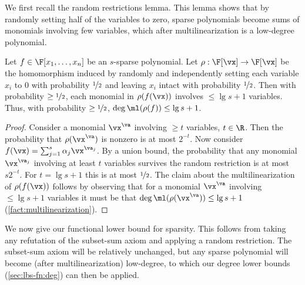 \documentclass{toc}
\begin{document}
We first recall the random restrictions lemma.  This lemma shows that by randomly setting half of the variables to zero, sparse polynomials become sums of monomials involving few variables, which after multilinearization is a low-degree polynomial.

\begin{lemma}\label{res:random-restriction}
        Let $f\in\F[x_1,\ldots,x_n]$ be an $s$-sparse polynomial.  Let $\rho:\F[\vx]\to\F[\vx]$ be the homomorphism induced by randomly and independently setting each variable $x_i$ to $0$ with probability $\nicefrac{1}{2}$ and leaving $x_i$ intact with probability $\nicefrac{1}{2}$.  Then with probability $\ge \nicefrac{1}{2}$, each monomial in $\rho(f(\vx))$ involves $\le \lg s+1$ variables.  Thus, with probability $\ge \nicefrac{1}{2}$, $\deg\ml(\rho(f))\le \lg s+1$.
\end{lemma}
\begin{proof}
        Consider a monomial $\vx^\va$ involving $\ge t$ variables, $t\in\R$.  Then the probability that $\rho(\vx^\va)$ is nonzero is at most $2^{-t}$.  Now consider $f(\vx)=\sum_{j=1}^s \alpha_j \vx^{\va_j}$. By a union bound, the probability that any monomial $\vx^{\va_j}$ involving at least $t$ variables survives the random restriction is at most $s2^{-t}$. For $t=\lg s+1$ this is at most $\nicefrac{1}{2}$.  The claim about the multilinearization of $\rho(f(\vx))$ follows by observing that for a monomial $\vx^\va$ involving $\le \lg s+1$ variables it must be that $\deg\ml(\rho(\vx^\va))\le \lg s+1$ (\autoref{fact:multilinearization}).
\end{proof}

We now give our functional lower bound for sparsity.  This follows from taking any refutation of the subset-sum axiom and applying a random restriction.  The subset-sum axiom will be relatively unchanged, but any sparse polynomial will become (after multilinearization) low-degree, to which our degree lower bounds (\autoref{sec:lbs-fn:deg}) can then be applied.
\end{document}
